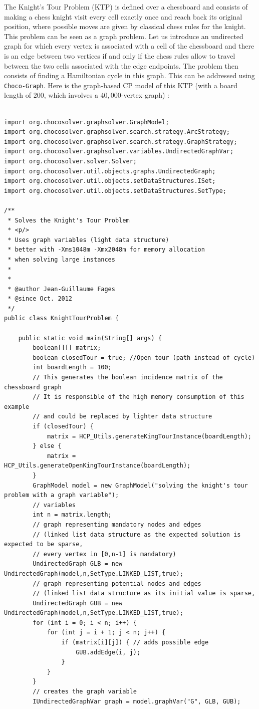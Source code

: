 \documentclass{article}
\begin{document}
The Knight's Tour Problem (KTP) is defined over a chessboard and consists of making a chess knight visit every cell exactly once and reach back its original position, where possible moves are given by classical chess rules for the knight. This problem can be seen as a graph problem. Let us introduce an undirected graph for which every vertex is associated with a cell of the chessboard and there is an edge between two vertices if and only if the chess rules allow to travel between the two cells associated with the edge endpoints. The problem then consists of finding a Hamiltonian cycle in this graph. This can be addressed using \texttt{Choco-Graph}. Here is the graph-based CP model of this KTP (with a board length of $200$, which involves a $40,000$-vertex graph) : 
\begin{lstlisting}

import org.chocosolver.graphsolver.GraphModel;
import org.chocosolver.graphsolver.search.strategy.ArcStrategy;
import org.chocosolver.graphsolver.search.strategy.GraphStrategy;
import org.chocosolver.graphsolver.variables.UndirectedGraphVar;
import org.chocosolver.solver.Solver;
import org.chocosolver.util.objects.graphs.UndirectedGraph;
import org.chocosolver.util.objects.setDataStructures.ISet;
import org.chocosolver.util.objects.setDataStructures.SetType;

/**
 * Solves the Knight's Tour Problem
 * <p/>
 * Uses graph variables (light data structure)
 * better with -Xms1048m -Xmx2048m for memory allocation
 * when solving large instances
 *
 *
 * @author Jean-Guillaume Fages
 * @since Oct. 2012
 */
public class KnightTourProblem {

	public static void main(String[] args) {
		boolean[][] matrix;
		boolean closedTour = true; //Open tour (path instead of cycle)
		int boardLength = 100;
		// This generates the boolean incidence matrix of the chessboard graph
		// It is responsible of the high memory consumption of this example
		// and could be replaced by lighter data structure
		if (closedTour) {
			matrix = HCP_Utils.generateKingTourInstance(boardLength);
		} else {
			matrix = HCP_Utils.generateOpenKingTourInstance(boardLength);
		}
		GraphModel model = new GraphModel("solving the knight's tour problem with a graph variable");
		// variables
		int n = matrix.length;
		// graph representing mandatory nodes and edges
		// (linked list data structure as the expected solution is expected to be sparse,
		// every vertex in [0,n-1] is mandatory)
		UndirectedGraph GLB = new UndirectedGraph(model,n,SetType.LINKED_LIST,true);
		// graph representing potential nodes and edges
		// (linked list data structure as its initial value is sparse,
		UndirectedGraph GUB = new UndirectedGraph(model,n,SetType.LINKED_LIST,true);
		for (int i = 0; i < n; i++) {
			for (int j = i + 1; j < n; j++) {
				if (matrix[i][j]) { // adds possible edge
					GUB.addEdge(i, j);
				}
			}
		}
		// creates the graph variable
		IUndirectedGraphVar graph = model.graphVar("G", GLB, GUB);


\end{lstlisting}
\end{document}
